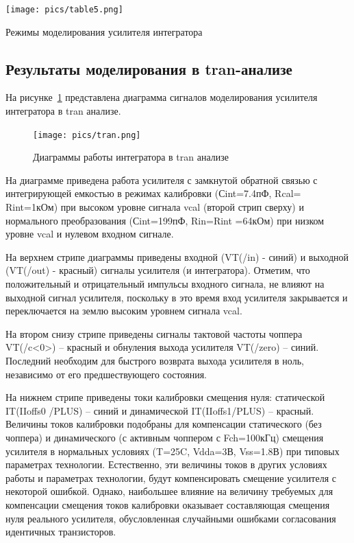 \documentclass[a4paper,12pt,oneside]{scrartcl}
\begin{document}
\begin{table}[!htb]
    \centering
    \texttt{[image: pics/table5.png]}
    \caption{Режимы моделирования усилителя интегратора}
    \label{fig:Table5}
\end{table}
\FloatBarrier






\subsection{Результаты моделирования в tran-анализе}

На рисунке~\ref{fig:tran} представлена диаграмма сигналов моделирования усилителя интегратора в tran анализе.

\begin{figure}[!htb]
\centering
\texttt{[image: pics/tran.png]}
\caption{Диаграммы работы интегратора в tran анализе}
\label{fig:tran}
\end{figure}

На диаграмме приведена работа усилителя с замкнутой обратной связью с интегрирующей емкостью в режимах калибровки (Сint=7.4пФ, Rcal= Rint=1кОм)  при высоком уровне сигнала vcal (второй стрип сверху) и нормального преобразования (Сint=199пФ, Rin=Rint =64кОм) при низком уровне vcal  и нулевом входном сигнале. 

На верхнем стрипе диаграммы приведены входной (VT(/in) - синий) и выходной (VT(/out) - красный) сигналы усилителя (и интегратора). Отметим, что положительный и отрицательный импульсы входного сигнала, не влияют на выходной сигнал усилителя, поскольку в это время вход усилителя закрывается и переключается на землю высоким уровнем сигнала vcal. 

На втором снизу стрипе приведены сигналы тактовой частоты чоппера VT(/c<0>) – красный и обнуления выхода усилителя  VT(/zero) – синий.  Последний необходим для быстрого возврата выхода усилителя в ноль, независимо от его предшествующего состояния.

На нижнем стрипе приведены токи калибровки смещения нуля: статической IT(IIoffs0 /PLUS) – синий и динамической IT(IIoffs1/PLUS) – красный.  Величины токов калибровки подобраны для компенсации статического (без чоппера) и динамического (с активным чоппером с Fch=100кГц) смещения усилителя в нормальных условиях (T=25C, Vdda=3В, Vss=1.8В) при типовых параметрах технологии. Естественно, эти величины токов в других условиях работы и параметрах технологии, будут компенсировать смещение усилителя с некоторой ошибкой. Однако, наибольшее влияние на величину требуемых  для компенсации смещения токов калибровки оказывает составляющая смещения нуля реального усилителя, обусловленная случайными ошибками согласования идентичных транзисторов.
\end{document}
